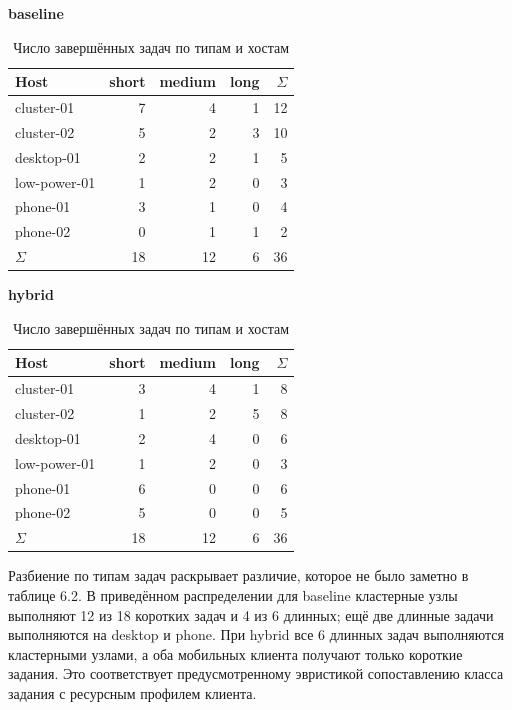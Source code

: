 \documentclass[a4paper,12pt]{extarticle}
\begin{document}
\begin{table}[H]
\centering
    \caption{Число завершённых задач по типам и хостам}
    \scriptsize
    \begin{minipage}{0.48\textwidth}
        \centering
        \textbf{baseline}
        \vspace{0.3em}
        \begin{tabular}{lrrrr}
            \toprule
            Host & short & medium & long & $\Sigma$ \\
            \midrule
            cluster-01 & 7 & 4 & 1 & 12 \\
            cluster-02 & 5 & 2 & 3 & 10 \\
            desktop-01 & 2 & 2 & 1 & 5 \\
            low-power-01 & 1 & 2 & 0 & 3 \\
            phone-01 & 3 & 1 & 0 & 4 \\
            phone-02 & 0 & 1 & 1 & 2 \\
            \midrule
            $\Sigma$ & 18 & 12 & 6 & 36 \\
            \bottomrule
        \end{tabular}
    \end{minipage}
    \hfill
    \begin{minipage}{0.48\textwidth}
        \centering
        \textbf{hybrid}
        \vspace{0.3em}
        \begin{tabular}{lrrrr}
            \toprule
            Host & short & medium & long & $\Sigma$ \\
            \midrule
            cluster-01 & 3 & 4 & 1 & 8 \\
            cluster-02 & 1 & 2 & 5 & 8 \\
            desktop-01 & 2 & 4 & 0 & 6 \\
            low-power-01 & 1 & 2 & 0 & 3 \\
            phone-01 & 6 & 0 & 0 & 6 \\
            phone-02 & 5 & 0 & 0 & 5 \\
            \midrule
            $\Sigma$ & 18 & 12 & 6 & 36 \\
            \bottomrule
        \end{tabular}
    \end{minipage}
\end{table}

Разбиение по типам задач раскрывает различие, которое не было заметно в таблице 6.2. В приведённом распределении для baseline кластерные узлы выполняют 12 из 18 коротких задач и 4 из 6 длинных; ещё две длинные задачи выполняются на desktop и phone. При hybrid все 6 длинных задач выполняются кластерными узлами, а оба мобильных клиента получают только короткие задания. Это соответствует предусмотренному эвристикой сопоставлению класса задания с ресурсным профилем клиента.
\end{document}
